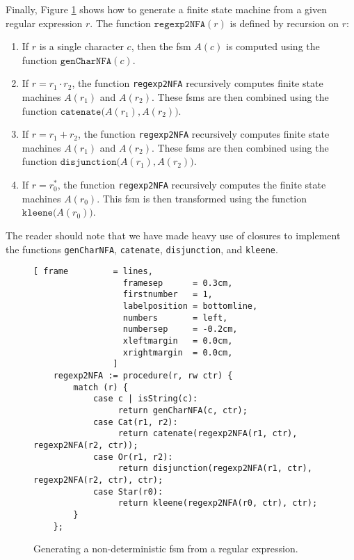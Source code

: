 Finally, Figure \ref{fig:regexp2NFA.stlx} shows how to generate a finite state machine
from a given regular expression $r$.  The function $\texttt{regexp2NFA}(r)$ is defined by
recursion on $r$:
\begin{enumerate}
\item If $r$ is a single character $c$, then the fsm $A(c)$ is computed using
      the function $\texttt{genCharNFA}(c)$.
\item If $r = r_1 \cdot r_2$, the function \texttt{regexp2NFA} recursively computes
      finite state machines $A(r_1)$ and $A(r_2)$.  These fsms are then combined
      using the function $\texttt{catenate}\bigr(A(r_1), A(r_2)\bigr)$.
\item If $r = r_1 + r_2$, the function \texttt{regexp2NFA} recursively computes
      finite state machines $A(r_1)$ and $A(r_2)$.  These fsms are then combined
      using the function $\texttt{disjunction}\bigr(A(r_1), A(r_2)\bigr)$.
\item If $r = r_0^*$, the function \texttt{regexp2NFA} recursively computes
      the finite state machines $A(r_0)$.  This fsm is then transformed
      using the function $\texttt{kleene}\bigr(A(r_0)\bigr)$.
\end{enumerate}
The reader should note that we have made heavy use of closures to implement the functions
\texttt{genCharNFA}, \texttt{catenate}, \texttt{disjunction}, and \texttt{kleene}.

\begin{figure}[!ht]
\centering
\begin{Verbatim}[ frame         = lines, 
                  framesep      = 0.3cm, 
                  firstnumber   = 1,
                  labelposition = bottomline,
                  numbers       = left,
                  numbersep     = -0.2cm,
                  xleftmargin   = 0.0cm,
                  xrightmargin  = 0.0cm,
                ]
    regexp2NFA := procedure(r, rw ctr) {
        match (r) {
            case c | isString(c): 
                 return genCharNFA(c, ctr);
            case Cat(r1, r2):
                 return catenate(regexp2NFA(r1, ctr), regexp2NFA(r2, ctr)); 
            case Or(r1, r2):
                 return disjunction(regexp2NFA(r1, ctr), regexp2NFA(r2, ctr), ctr);
            case Star(r0):
                 return kleene(regexp2NFA(r0, ctr), ctr);
        }
    };
\end{Verbatim}
\vspace*{-0.3cm}
\caption{Generating a non-deterministic fsm from a regular expression.}
\label{fig:regexp2NFA.stlx}
\end{figure}

